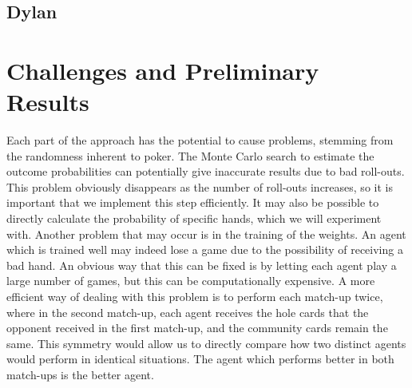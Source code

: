 \documentclass{article}
\begin{document}
\subsection{Dylan}
\section{Challenges and Preliminary Results}
Each part of the approach has the potential to cause problems, stemming from the randomness inherent to poker. The Monte Carlo search to estimate the outcome probabilities can potentially give inaccurate results due to bad roll-outs. This problem obviously disappears as the number of roll-outs increases, so it is important that we implement this step efficiently. It may also be possible to directly calculate the probability of specific hands, which we will experiment with. Another problem that may occur is in the training of the weights. An agent which is trained well may indeed lose a game due to the possibility of receiving a bad hand. An obvious way that this can be fixed is by letting each agent play a large number of games, but this can be computationally expensive. A more efficient way of dealing with this problem is to perform each match-up twice, where in the second match-up, each agent receives the hole cards that the opponent received in the first match-up, and the community cards remain the same. This symmetry would allow us to directly compare how two distinct agents would perform in identical situations. The agent which performs better in both match-ups is the better agent. 
\end{document}
